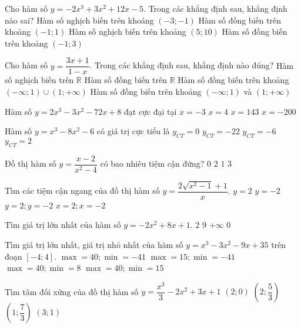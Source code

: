 \begin{ex}%
	Cho hàm số $y=-2x^3+3x^2+12x-5$. Trong các khẳng định sau, khẳng định nào sai?
	\choice
	{Hàm số nghịch biến trên khoảng $\left(-3;-1 \right)$}
	{ Hàm số đồng biến trên khoảng $\left(-1;1 \right)$}
	{Hàm số nghịch biến trên khoảng $\left(5 ;10 \right)$}
	{\True Hàm số đồng biến trên khoảng $\left(-1;3\right)$}
\end{ex}
\begin{ex}%
	Cho hàm số $y= \dfrac{3x+1}{1-x}$. Trong các khẳng định sau, khẳng định nào đúng?
	\choice
	{Hàm số nghịch biến trên $\mathbb{R}$}
	{Hàm số đồng biến trên $\mathbb{R}$}
	{Hàm số đồng biến trên khoảng $\left( -\infty ;1 \right)\cup \left( 1;+\infty  \right)$}
	{\True Hàm số đồng biến trên khoảng $\left(-\infty ;1 \right)$ và $\left( 1;+\infty  \right)$}
\end{ex}
\begin{ex}%
	Hàm số $y=2x^3-3x^2-72x+8$ đạt cực đại tại
	\choice
	{\True $x=-3$}
	{$x=4$}
	{$x=143$}		
	{$x=-200$}
\end{ex}
\begin{ex}%
	Hàm số $y=x^3-8x^2-6$ có giá trị cực tiểu là
	\choice
	{${y}_{CT}=0$}
	{\True ${y}_{CT}=-22$}
	{${y}_{CT}=-6$}
	{${y}_{CT}=2$}
\end{ex}
\begin{ex}%
	Đồ thị hàm số $y= \dfrac{x-2}{x^2-4}$ có bao nhiêu tiệm cận đứng?
	\choice
	{$0$}
	{$2$}
	{\True $1$}
	{$3$}
\end{ex}
\begin{ex}%
	Tìm các tiệm cận ngang của đồ thị hàm số $y= \dfrac{2\sqrt{x^2-1}+1}{x}$.
	\choice
	{$y=2$}
	{$y=-2$}
	{\True $y=2; y=-2$}
	{$x=2; x=-2$}
\end{ex}
\begin{ex}%
	Tìm giá trị lớn nhất của hàm số $y=-2x^2+8x+1$.
	\choice
	{$2$}
	{\True $9$}
	{$+\infty $}
	{$0$}
\end{ex}
\begin{ex}%
	Tìm giá trị lớn nhất, giá trị nhỏ nhất của hàm số $y=x^3-3x^2-9x+35$ trên đoạn $\left[-4; 4 \right]$.
	\choice
	{\True $\max =40;\min=-41$	}
	{$\max=15;\min=-41$}
	{$\max=40;\min=8$}
	{$\max=40;\min=15$}
\end{ex}
\begin{ex}%
	Tìm tâm đối xứng của đồ thị hàm số $y= \dfrac{x^3}{3}-2x^2+3x+1$
	\choice
	{$\left( 2;0\right)$}
	{\True $\left(2;\dfrac{5}{3} \right)$}
	{ $\left( 1;\dfrac{7}{3} \right)$}
	{ $\left( 3;1 \right)$}
\end{ex}	
